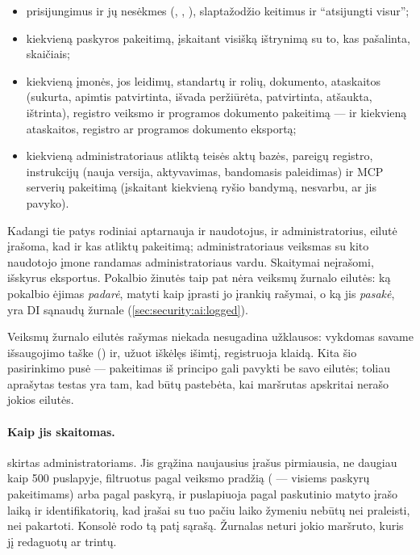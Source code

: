 \begin{itemize}
  \item prisijungimus ir jų nesėkmes (, ,
    ), slaptažodžio keitimus ir \enquote{atsijungti
    visur};
  \item kiekvieną paskyros pakeitimą, įskaitant visišką ištrynimą su to, kas pašalinta,
    skaičiais;
  \item kiekvieną įmonės, jos leidimų, standartų ir rolių, dokumento, ataskaitos (sukurta,
    apimtis patvirtinta, išvada peržiūrėta, patvirtinta, atšaukta, ištrinta), registro
    veiksmo ir programos dokumento pakeitimą --- ir kiekvieną ataskaitos, registro ar
    programos dokumento eksportą;
  \item kiekvieną administratoriaus atliktą teisės aktų bazės, pareigų registro, instrukcijų
    (nauja versija, aktyvavimas, bandomasis paleidimas) ir MCP serverių pakeitimą (įskaitant
    kiekvieną ryšio bandymą, nesvarbu, ar jis pavyko).
\end{itemize}

Kadangi tie patys rodiniai aptarnauja ir naudotojus, ir administratorius, eilutė įrašoma, kad
ir kas atliktų pakeitimą; administratoriaus veiksmas su kito naudotojo įmone randamas
administratoriaus vardu. Skaitymai neįrašomi, išskyrus eksportus. Pokalbio žinutės taip pat
nėra veiksmų žurnalo eilutės: ką pokalbio ėjimas \emph{padarė}, matyti kaip įprasti jo įrankių
rašymai, o ką jis \emph{pasakė}, yra DI sąnaudų žurnale (\cref{sec:security:ai:logged}).

Veiksmų žurnalo eilutės rašymas niekada nesugadina užklausos:  vykdomas savame
išsaugojimo taške () ir, užuot iškėlęs išimtį, registruoja klaidą. Kita šio
pasirinkimo pusė --- pakeitimas iš principo gali pavykti be savo eilutės; toliau aprašytas
testas yra tam, kad būtų pastebėta, kai maršrutas apskritai nerašo jokios eilutės.

\paragraph{Kaip jis skaitomas.}  skirtas administratoriams. Jis
grąžina naujausius įrašus pirmiausia, ne daugiau kaip 500 puslapyje, filtruotus pagal veiksmo
pradžią ( --- visiems paskyrų pakeitimams) arba pagal paskyrą, ir puslapiuoja
pagal paskutinio matyto įrašo laiką ir identifikatorių, kad įrašai su tuo pačiu laiko žymeniu
nebūtų nei praleisti, nei pakartoti. Konsolė rodo tą patį sąrašą. Žurnalas neturi jokio
maršruto, kuris jį redaguotų ar trintų.


